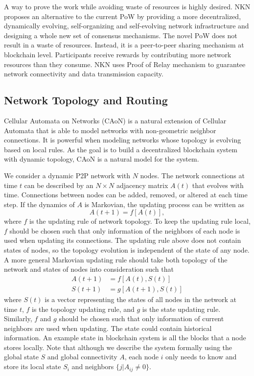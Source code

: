 \documentclass[reprint,pre,aps]{revtex4-1}
\begin{document}
A way to prove the work while avoiding waste of resources is highly desired. NKN proposes an alternative to the current PoW by providing a more decentralized, dynamically evolving, self-organizing and self-evolving network infrastructure and designing a whole new set of consensus mechanisms. The novel PoW does not result in a waste of resources. Instead, it is a peer-to-peer sharing mechanism at blockchain level. Participants receive rewards by contributing more network resources than they consume. NKN uses Proof of Relay mechanism to guarantee network connectivity and data transmission capacity.

\subsection{Network Topology and Routing}

Cellular Automata on Networks (CAoN) is a natural extension of Cellular Automata \cite{yang2007cellular, marr2007regularizing, smith2011network} that is able to model networks with non-geometric neighbor connections. It is powerful when modeling networks whose topology is evolving based on local rules. As the goal is to build a decentralized blockchain system with dynamic topology, CAoN is a natural model for the system.

We consider a dynamic P2P network with $N$ nodes. The network connections at time $t$ can be described by an $N \times N$ adjacency matrix $A(t)$ that evolves with time. Connections between nodes can be added, removed, or altered at each time step. If the dynamics of $A$ is Markovian, the updating process can be written as
\begin{equation}
A(t+1) = f[A(t)],
\end{equation}
where $f$ is the updating rule of network topology. To keep the updating rule local, $f$ should be chosen such that only information of the neighbors of each node is used when updating its connections. The updating rule above does not contain states of nodes, so the topology evolution is independent of the state of any node. A more general Markovian updating rule should take both topology of the network and states of nodes into consideration such that
\begin{equation}
\begin{aligned}
A(t+1) &= f[A(t), S(t)]\\
S(t+1) &= g[A(t+1), S(t)]
\end{aligned}
\end{equation}
where $S(t)$ is a vector representing the states of all nodes in the network at time $t$, $f$ is the topology updating rule, and $g$ is the state updating rule. Similarly, $f$ and $g$ should be chosen such that only information of current neighbors are used when updating. The state could contain historical information. An example state in blockchain system is all the blocks that a node stores locally. Note that although we describe the system formally using the global state $S$ and global connectivity $A$, each node $i$ only needs to know and store its local state $S_i$ and neighbors $\{ j | A_{ij} \neq 0 \}$.
\end{document}
